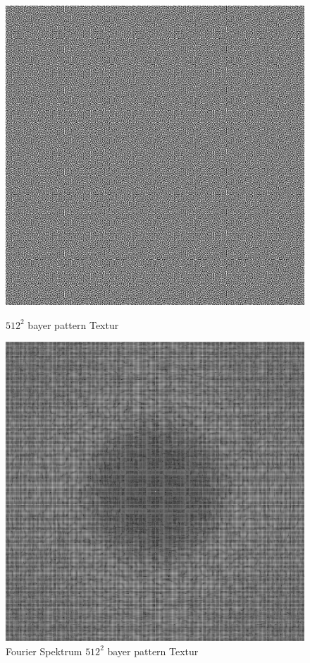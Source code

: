 \begin{figure}[H]\label{pic:tiledBlueNoiseFFT}
    \centering
    \begin{minipage}[t]{0.45\linewidth}
        \centering
        \includegraphics[width=\linewidth]{content/BlueNoise/Bilder/BlueNoise64Tiled.png}
        \caption{$512^{2}$ bayer pattern Textur}
    \end{minipage}
    \hfill
    \begin{minipage}[t]{0.45\linewidth}
        \centering
        \includegraphics[width=\linewidth]{content/BlueNoise/Bilder/FFT_BlueNoise64Tiled.png}
        \caption{Fourier Spektrum $512^{2}$ bayer pattern Textur}
    \end{minipage}
\end{figure}

